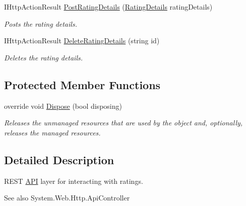 \begin{DoxyCompactItemize}
I\+Http\+Action\+Result \hyperlink{class_open_1_1_g_i_1_1hypermart_1_1_controllers_1_1_a_p_i_1_1_rating_details_controller_a8319f5f58c948de731eac334adcd2e82}{Post\+Rating\+Details} (\hyperlink{class_open_1_1_g_i_1_1hypermart_1_1_models_1_1_rating_details}{Rating\+Details} rating\+Details)
\begin{DoxyCompactList}\small\item\em Posts the rating details. \end{DoxyCompactList}\item 
I\+Http\+Action\+Result \hyperlink{class_open_1_1_g_i_1_1hypermart_1_1_controllers_1_1_a_p_i_1_1_rating_details_controller_aa92516d49a489314191626dc9cdb4a34}{Delete\+Rating\+Details} (string id)
\begin{DoxyCompactList}\small\item\em Deletes the rating details. \end{DoxyCompactList}\end{DoxyCompactItemize}
\subsection*{Protected Member Functions}
\begin{DoxyCompactItemize}
\item 
override void \hyperlink{class_open_1_1_g_i_1_1hypermart_1_1_controllers_1_1_a_p_i_1_1_rating_details_controller_a81ada59de033f14c4758007d4a243644}{Dispose} (bool disposing)
\begin{DoxyCompactList}\small\item\em Releases the unmanaged resources that are used by the object and, optionally, releases the managed resources. \end{DoxyCompactList}\end{DoxyCompactItemize}


\subsection{Detailed Description}
R\+E\+ST \hyperlink{namespace_open_1_1_g_i_1_1hypermart_1_1_controllers_1_1_a_p_i}{A\+PI} layer for interacting with ratings. 

\begin{DoxySeeAlso}{See also}
System.\+Web.\+Http.\+Api\+Controller


\end{DoxySeeAlso}


